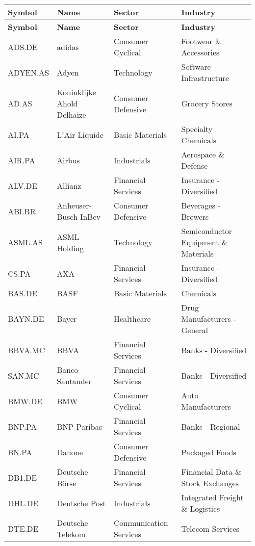 \begin{longtable}{|p{2cm}|p{3cm}|p{4cm}|p{4cm}|}
\hline
\textbf{Symbol} & \textbf{Name} & \textbf{Sector} & \textbf{Industry} \\ \midrule
\endfirsthead

\hline
\textbf{Symbol} & \textbf{Name} & \textbf{Sector} & \textbf{Industry} \\ \midrule
\endhead

\endfoot

\hline
ADS.DE & adidas & Consumer Cyclical & Footwear \& Accessories \\ \hline
ADYEN.AS & Adyen & Technology & Software - Infrastructure \\ \hline
AD.AS & Koninklijke Ahold Delhaize & Consumer Defensive & Grocery Stores \\ \hline
AI.PA & L'Air Liquide & Basic Materials & Specialty Chemicals \\ \hline
AIR.PA & Airbus & Industrials & Aerospace \& Defense \\ \hline
ALV.DE & Allianz & Financial Services & Insurance - Diversified \\ \hline
ABI.BR & Anheuser-Busch InBev & Consumer Defensive & Beverages - Brewers \\ \hline
ASML.AS & ASML Holding & Technology & Semiconductor Equipment \& Materials \\ \hline
CS.PA & AXA & Financial Services & Insurance - Diversified \\ \hline
BAS.DE & BASF & Basic Materials & Chemicals \\ \hline
BAYN.DE & Bayer & Healthcare & Drug Manufacturers - General \\ \hline
BBVA.MC & BBVA & Financial Services & Banks - Diversified \\ \hline
SAN.MC & Banco Santander & Financial Services & Banks - Diversified \\ \hline
BMW.DE & BMW & Consumer Cyclical & Auto Manufacturers \\ \hline
BNP.PA & BNP Paribas & Financial Services & Banks - Regional \\ \hline
BN.PA & Danone & Consumer Defensive & Packaged Foods \\ \hline
DB1.DE & Deutsche Börse & Financial Services & Financial Data \& Stock Exchanges \\ \hline
DHL.DE & Deutsche Post & Industrials & Integrated Freight \& Logistics \\ \hline
DTE.DE & Deutsche Telekom & Communication Services & Telecom Services \\ \hline

\end{longtable}
